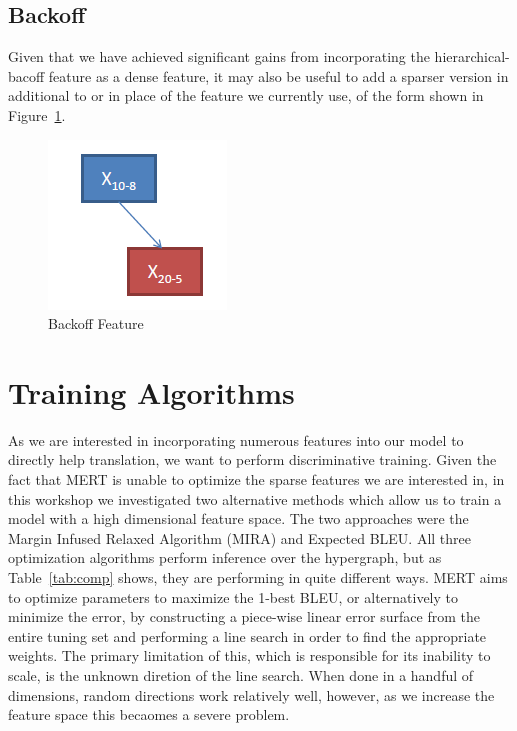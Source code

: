 \subsection{Backoff}
Given that we have achieved significant gains from incorporating the hierarchical-bacoff feature as a dense feature, it may also be useful to add a sparser version in additional to or in place of the feature we currently use, of the form shown in Figure~\ref{fig:back_feat}.


\begin{figure}[h]
	\centering
		\includegraphics[scale=0.5]{training_img_files/back_feat.PNG}
	\caption{Backoff Feature}
	\label{fig:back_feat}
\end{figure}

\section{Training Algorithms}

As we are interested in incorporating numerous features into our model to directly help translation, we want to perform discriminative training. Given the fact that MERT is unable to optimize the sparse features we are interested in, in this workshop we investigated two alternative methods which allow us to train a model with a high dimensional feature space. The two approaches were the Margin Infused Relaxed Algorithm (MIRA) and Expected BLEU. All three optimization algorithms perform inference over the hypergraph, but as Table~\ref{tab:comp} shows, they are performing in quite different ways. MERT aims to optimize parameters to maximize the 1-best BLEU, or alternatively to minimize the error, by constructing a piece-wise linear error surface from the entire tuning set and performing a line search in order to find the appropriate weights. The primary limitation of this, which is responsible for its inability to scale, is the unknown diretion of the line search. When done in a handful of dimensions, random directions work relatively well, however, as we increase the feature space this becaomes a severe problem. 

